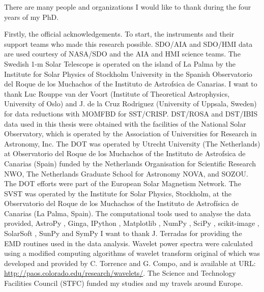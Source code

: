 \begin{acknowledgements}      
    
    There are many people and organizations I would like to thank during the four years of my PhD.
    
    Firstly, the official acknowledgements.
    To start, the instruments and their support teams who made this research possible.
    SDO/AIA and SDO/HMI data are used courtesy of NASA/SDO and the AIA and HMI science teams.
    The Swedish 1-m Solar Telescope is operated on the island of La Palma by the Institute for Solar Physics of Stockholm University in the Spanish Observatorio del Roque de los Muchachos of the Instituto de Astrofsica de Canarias.
    I want to thank Luc Rouppe van der Voort (Institute of Theoretical Astrophysics, University of Oslo) and J. de la Cruz Rodriguez (University of Uppsala, Sweden) for data reductions with MOMFBD for SST/CRISP.
    DST/ROSA and DST/IBIS data used in this thesis were obtained with the facilities of the National Solar Observatory, which is operated by the Association of Universities for Research in Astronomy, Inc.
    The DOT was operated by Utrecht University (The Netherlands) at Observatorio del Roque de los Muchachos of the Instituto de Astrofsica de Canarias (Spain) funded by the Netherlands Organisation for Scientific Research NWO, The Netherlands Graduate School for Astronomy NOVA, and SOZOU.
    The DOT efforts were part of the European Solar Magnetism Network.
    The SVST was operated by the Institute for Solar Physics, Stockholm, at the Observatorio del Roque de los Muchachos of the Instituto de Astrofísica de Canarias (La Palma, Spain).
    The computational tools used to analyse the data provided, AstroPy \cite{theastropycollaboration2013}, Ginga, IPython \citep{perez2007}, Matplotlib \cite{hunter2007}, NumPy \citep{jones2001}, SciPy \citep{jones2001}, scikit-image \citep{vanderwalt2014}, SolarSoft \citep{1998SoPh..182..497F}, SunPy \citep{thesunpycommunity2015a} and SymPy \cite{sympydevelopmentteam2014}
    I want to thank J. Terradas for providing the EMD routines used in the data analysis.
    Wavelet power spectra were calculated using a modified computing algorithms of wavelet transform original of which was developed and provided by C. Torrence and G. Compo, and is available at URL: \url{http://paos.colorado.edu/research/wavelets/}.
    The Science and Technology Facilities Council (STFC) funded my studies and my travels around Europe.
    

\end{acknowledgements}
